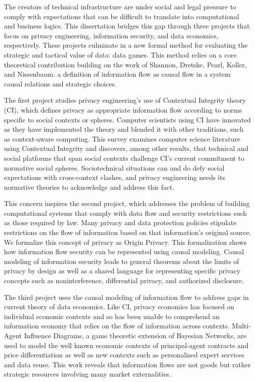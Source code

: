 \documentclass[../thesis.tex]{subfiles}
\begin{document}
 The creators of technical infrastructure are under social and legal pressure to comply with expectations that can be difficult to translate into computational and business logics.
 This dissertation bridges this gap through three projects that focus on privacy engineering, information security, and data economics, respectively.
 These projects culminate in a new formal method for evaluating the strategic and tactical value of data: data games.
 This method relies on a core theoretical contribution building on the work of Shannon, Dretske, Pearl, Koller, and Nissenbaum: a definition of information flow as causal flow in a system
 causal relations and strategic choices.

 The first project studies privacy engineering's use of
 Contextual Integrity theory (CI), which defines
 privacy as appropriate information flow according to norms
 specific to social contexts or spheres.
 Computer scientists using CI
 have innovated as they have implemented the theory and
 blended it with other traditions, such as context-aware
 computing. This survey examines
 computer science literature using Contextual Integrity and
 discovers, among other results, that technical and social platforms
 that span social contexts challenge CI's current commitment
 to normative social spheres.
 Sociotechnical situations can and do defy social expectations
 with cross-context clashes, and privacy engineering
 needs its normative theories to acknowledge and address this
 fact.
 
 This concern inspires the second project, which addresses the
 problem of building computational systems that comply with data
 flow and security restrictions such as those required by law.
 Many privacy and data protection policies stipulate
 restrictions on the flow of information based on that
 information's original source.
 We formalize this concept of privacy as Origin Privacy.
 This formalization shows how information flow security
 can be represented using causal modeling.
 Causal modeling of information security leads to
 general theorems about the limits of privacy by design
 as well as a shared language for representing specific
 privacy concepts such as noninterference, differential
 privacy, and authorized disclosure.

 The third project uses the causal modeling of information
 flow to address gaps in current theory of data economics.
 Like CI, privacy economics has focused on individual
 economic contexts and so has been unable to comprehend
 an information economy that relies on the flow of
 information across contexts.
 Multi-Agent Influence Diagrams, a game theoretic extension
 of Bayesian Networks, are used to model the well known
 economic contexts of principal-agent contracts and
 price differentiation as well as new contexts
 such as personalized expert services and data reuse.
 This work reveals that information flows are not
 goods but rather strategic resources involving
 many market externalities.
 
 
\end{document}
